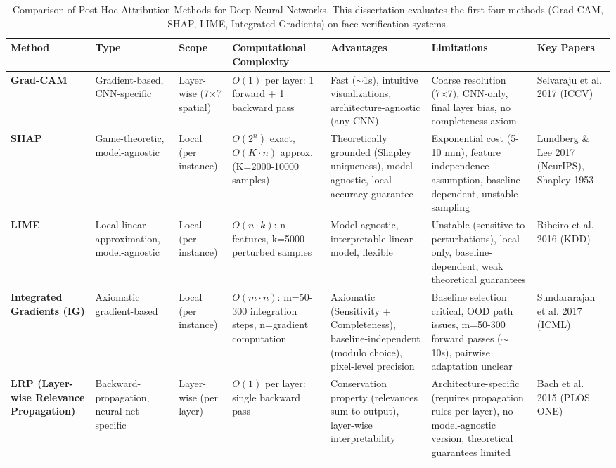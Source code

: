 
\begin{table}[htbp]
\centering
\footnotesize
\caption{Comparison of Post-Hoc Attribution Methods for Deep Neural Networks. This dissertation evaluates the first four methods (Grad-CAM, SHAP, LIME, Integrated Gradients) on face verification systems.}
\label{tab:xai_methods_comparison}
\begin{tabular}{lp{2cm}p{1.5cm}p{2.2cm}p{3.2cm}p{3.5cm}p{2cm}}
\toprule
\textbf{Method} & \textbf{Type} & \textbf{Scope} & \textbf{Computational Complexity} & \textbf{Advantages} & \textbf{Limitations} & \textbf{Key Papers} \\
\midrule
\textbf{Grad-CAM}
& Gradient-based, CNN-specific
& Layer-wise (7×7 spatial)
& $O(1)$ per layer: 1 forward + 1 backward pass
& Fast ($\sim$1s), intuitive visualizations, architecture-agnostic (any CNN)
& Coarse resolution (7×7), CNN-only, final layer bias, no completeness axiom
& Selvaraju et al. 2017 (ICCV) \\
\midrule
\textbf{SHAP}
& Game-theoretic, model-agnostic
& Local (per instance)
& $O(2^n)$ exact, $O(K \cdot n)$ approx. (K=2000-10000 samples)
& Theoretically grounded (Shapley uniqueness), model-agnostic, local accuracy guarantee
& Exponential cost (5-10 min), feature independence assumption, baseline-dependent, unstable sampling
& Lundberg \& Lee 2017 (NeurIPS), Shapley 1953 \\
\midrule
\textbf{LIME}
& Local linear approximation, model-agnostic
& Local (per instance)
& $O(n \cdot k)$: n features, k=5000 perturbed samples
& Model-agnostic, interpretable linear model, flexible
& Unstable (sensitive to perturbations), local only, baseline-dependent, weak theoretical guarantees
& Ribeiro et al. 2016 (KDD) \\
\midrule
\textbf{Integrated Gradients (IG)}
& Axiomatic gradient-based
& Local (per instance)
& $O(m \cdot n)$: m=50-300 integration steps, n=gradient computation
& Axiomatic (Sensitivity + Completeness), baseline-independent (modulo choice), pixel-level precision
& Baseline selection critical, OOD path issues, m=50-300 forward passes ($\sim$10s), pairwise adaptation unclear
& Sundararajan et al. 2017 (ICML) \\
\midrule
\textbf{LRP (Layer-wise Relevance Propagation)}
& Backward-propagation, neural net-specific
& Layer-wise (per layer)
& $O(1)$ per layer: single backward pass
& Conservation property (relevances sum to output), layer-wise interpretability
& Architecture-specific (requires propagation rules per layer), no model-agnostic version, theoretical guarantees limited
& Bach et al. 2015 (PLOS ONE) \\
\bottomrule
\end{tabular}
\end{table}

